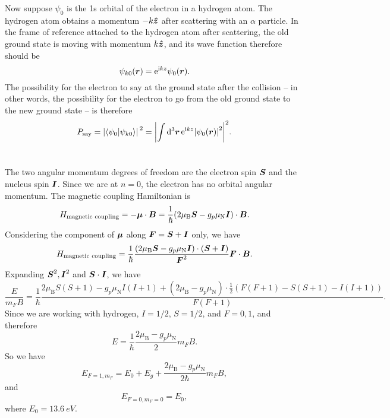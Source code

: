 \documentclass[hyperref, a4paper]{article}
\newcommand*{\ii}{\mathrm{i}}
\newcommand*{\ee}{\mathrm{e}}
\newcommand*{\muB}{\mu_{\text{B}}}
\newcommand*{\muN}{\mu_{\text{N}}}
\begin{document}
Now suppose $\psi_0$ is the 1s orbital of the electron in a hydrogen atom.
The hydrogen atom obtains a momentum $- k \vu*{z}$ 
after scattering with an $\alpha$ particle.
In the frame of reference attached to the hydrogen atom
after scattering, 
the old ground state is moving with momentum $k \vu*{z}$, 
and its wave function therefore should be 
\begin{equation}
    \psi_{k0}(\vb*{r}) = \ee^{\ii k z} \psi_0(\vb*{r}).
\end{equation}
The possibility for the electron to say at the ground state 
after the collision 
-- in other words, 
the possibility for the electron 
to go from the old ground state to the new ground state -- 
is therefore 
\begin{equation}
    P_{\text{say}} = \abs*{\braket{\psi_0}{\psi_{k0}}}^2 
    = \abs{\int \dd[3]{\vb*{r}} \ee^{\ii k z} \abs{\psi_0(\vb*{r})}^2 }^2.
\end{equation}

\section{}

The two angular momentum degrees of freedom 
are the electron spin $\vb*{S}$
and the nucleus spin $\vb*{I}$.
Since we are at $n = 0$,
the electron has no orbital angular momentum.
The magnetic coupling Hamiltonian is 
\begin{equation}
    H_{\text{magnetic coupling}} = - \vb*{\mu} \cdot \vb*{B}
    = \frac{1}{\hbar} (2 \muB \vb*{S} - g_p \muN \vb*{I}) \cdot \vb*{B}.
\end{equation}
Considering the component of $\vb*{\mu}$ along $\vb*{F} = \vb*{S} + \vb*{I}$ only, we have 
\begin{equation}
    \begin{aligned}
        H_{\text{magnetic coupling}} = 
        \frac{1}{\hbar} 
        \frac{
            (2 \muB \vb*{S} - g_p \muN \vb*{I}) \cdot (\vb*{S} + \vb*{I}) 
        }{\vb*{F}^2} \vb*{F} \cdot \vb*{B} .
    \end{aligned}
\end{equation}
Expanding $\vb*{S}^2, \vb*{I}^2$ and $\vb*{S} \cdot \vb*{I}$, we have
\begin{equation}
    \frac{E}{m_F B} = \frac{1}{\hbar} \frac{
        2 \muB S(S+1) 
        - g_p \muN I(I+1)
        + (2 \muB - g_p \muN) \cdot 
        \frac{1}{2} (F(F+1) - S(S+1) - I(I+1))
    }{
        F(F+1)
    }.
\end{equation}
Since we are working with hydrogen, $I = 1/2$, $S = 1/2$, 
and $F = 0, 1$, and therefore 
\begin{equation}
    E = \frac{1}{\hbar} \frac{2 \muB - g_p \muN}{2} m_F B.
\end{equation}
So we have 
\begin{equation}
    E_{F=1, m_F} = E_0 + E_g + \frac{2 \muB - g_p \muN}{2 \hbar} m_F B,
\end{equation}
and 
\begin{equation}
    E_{F=0, m_F = 0} = E_0,
\end{equation}
where $E_0 = \SI{13.6}{eV}$.
\end{document}
